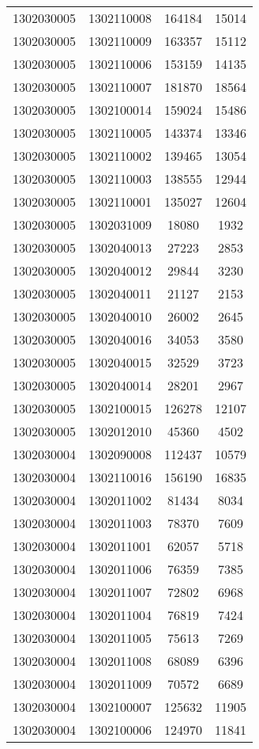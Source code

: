 \begin{longtable}[h]{llcc}
		1302030005 & 1302110008 & 164184 & 15014\\
		1302030005 & 1302110009 & 163357 & 15112\\
		1302030005 & 1302110006 & 153159 & 14135\\
		1302030005 & 1302110007 & 181870 & 18564\\
		1302030005 & 1302100014 & 159024 & 15486\\
		1302030005 & 1302110005 & 143374 & 13346\\
		1302030005 & 1302110002 & 139465 & 13054\\
		1302030005 & 1302110003 & 138555 & 12944\\
		1302030005 & 1302110001 & 135027 & 12604\\
		1302030005 & 1302031009 & 18080 & 1932\\
		1302030005 & 1302040013 & 27223 & 2853\\
		1302030005 & 1302040012 & 29844 & 3230\\
		1302030005 & 1302040011 & 21127 & 2153\\
		1302030005 & 1302040010 & 26002 & 2645\\
		1302030005 & 1302040016 & 34053 & 3580\\
		1302030005 & 1302040015 & 32529 & 3723\\
		1302030005 & 1302040014 & 28201 & 2967\\
		1302030005 & 1302100015 & 126278 & 12107\\
		1302030005 & 1302012010 & 45360 & 4502\\
		1302030004 & 1302090008 & 112437 & 10579\\
		1302030004 & 1302110016 & 156190 & 16835\\
		1302030004 & 1302011002 & 81434 & 8034\\
		1302030004 & 1302011003 & 78370 & 7609\\
		1302030004 & 1302011001 & 62057 & 5718\\
		1302030004 & 1302011006 & 76359 & 7385\\
		1302030004 & 1302011007 & 72802 & 6968\\
		1302030004 & 1302011004 & 76819 & 7424\\
		1302030004 & 1302011005 & 75613 & 7269\\
		1302030004 & 1302011008 & 68089 & 6396\\
		1302030004 & 1302011009 & 70572 & 6689\\
		1302030004 & 1302100007 & 125632 & 11905\\
		1302030004 & 1302100006 & 124970 & 11841\\

\end{longtable}
